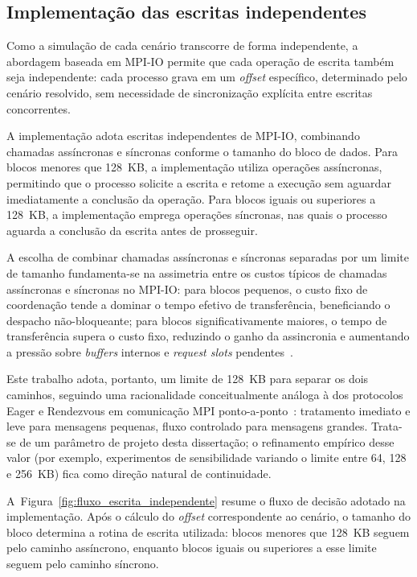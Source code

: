 \subsection{Implementação das escritas independentes}
\label{sec:escritas_independentes}

Como a simulação de cada cenário transcorre de forma independente,
a abordagem baseada em MPI-IO permite que cada operação de escrita
também seja independente: cada processo grava em um \textit{offset}
específico, determinado pelo cenário resolvido, sem necessidade de
sincronização explícita entre escritas concorrentes.

A implementação adota escritas independentes de MPI-IO, combinando chamadas
assíncronas e síncronas conforme o tamanho do bloco de dados. Para blocos
menores que 128~KB, a implementação utiliza operações assíncronas,
permitindo que o processo solicite a escrita e retome a execução sem
aguardar imediatamente a conclusão da operação. Para blocos iguais ou superiores a 128~KB, a
implementação emprega operações síncronas, nas quais o processo aguarda a
conclusão da escrita antes de prosseguir.

A escolha de combinar chamadas assíncronas e síncronas separadas por
um limite de tamanho fundamenta-se na assimetria entre os
custos típicos de chamadas assíncronas e síncronas no MPI-IO: para
blocos pequenos, o custo fixo de coordenação tende a dominar o tempo
efetivo de transferência, beneficiando o despacho não-bloqueante;
para blocos significativamente maiores, o tempo de transferência
supera o custo fixo, reduzindo o ganho da assincronia e aumentando a
pressão sobre \textit{buffers} internos e \textit{request slots}
pendentes~\cite{Rr:10,Wea:99}.

Este trabalho adota, portanto, um limite de 128~KB para separar os dois
caminhos, seguindo uma racionalidade conceitualmente análoga à dos
protocolos Eager e Rendezvous em comunicação MPI
ponto-a-ponto~\cite{Wea:99,Rrw:05}: tratamento imediato e leve para
mensagens pequenas, fluxo controlado para mensagens grandes.
Trata-se de um parâmetro de projeto desta dissertação; o refinamento
empírico desse valor (por exemplo, experimentos de sensibilidade
variando o limite entre 64, 128 e 256~KB) fica como direção natural
de continuidade.

A~Figura~\ref{fig:fluxo_escrita_independente} resume o fluxo de decisão
adotado na implementação. Após o cálculo do \textit{offset} correspondente ao
cenário, o tamanho do bloco determina a rotina de escrita utilizada: blocos
menores que 128~KB seguem pelo caminho assíncrono, enquanto blocos iguais ou
superiores a esse limite seguem pelo caminho síncrono.

